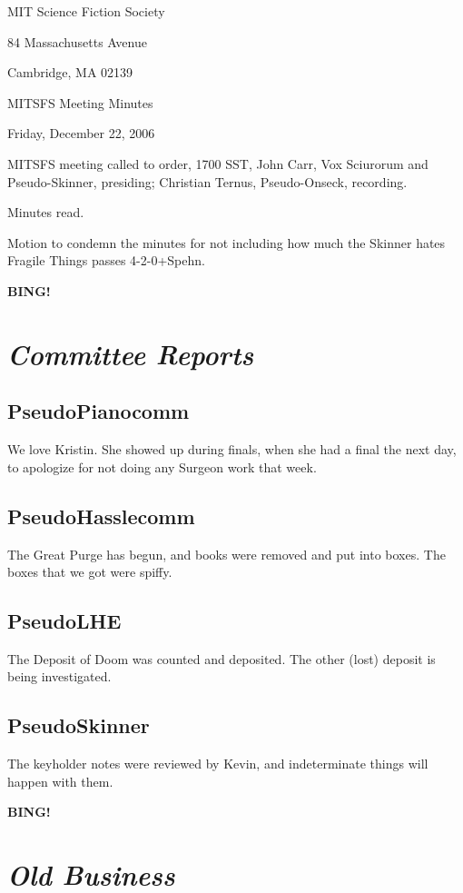 \documentclass[10pt]{article}
\newcommand{\bing}{{\bf BING!} }
\newcommand{\goto}[1]{\bing \vskip 12pt \section*{{\em{#1}}}}
\begin{document}
\begin{center}

MIT Science Fiction Society

84 Massachusetts Avenue

Cambridge, MA 02139

\vspace{12pt}

MITSFS Meeting Minutes

Friday, December 22, 2006

\end{center}

\vspace{18pt}

\setlength{\parskip}{6pt}

\noindent
MITSFS meeting called to order, 1700 SST,
John Carr, Vox Sciurorum and Pseudo-Skinner, presiding; Christian Ternus, Pseudo-Onseck, recording.

Minutes read.

Motion to condemn the minutes for not including how much the Skinner hates Fragile Things passes 4-2-0+Spehn.

\goto{Committee Reports}

\subsection*{PseudoPianocomm}
We love Kristin. She showed up during finals, when she had a final the next day, to apologize for not doing any Surgeon work that week.

\subsection*{PseudoHasslecomm}
The Great Purge has begun, and books were removed and put into boxes.   The boxes that we got were spiffy.

\subsection*{PseudoLHE}
The Deposit of Doom was counted and deposited.  The other (lost) deposit is being investigated.

\subsection*{PseudoSkinner}
The keyholder notes were reviewed by Kevin, and indeterminate things will happen with them.

\goto{Old Business}
\end{document}
